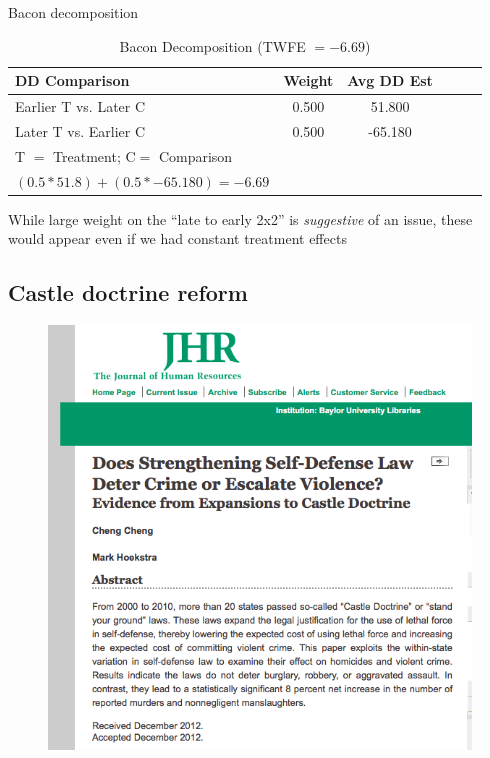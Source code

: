 \documentclass{beamer}
\begin{document}
\begin{frame}{Bacon decomposition}
\begin{table}[htbp]\centering
\small
\caption{Bacon Decomposition (TWFE $= -6.69$)}
\begin{center}
\begin{tabular}{l*{5}{c}}
\hline
\multicolumn{1}{l}{\textbf{DD Comparison}}&
\multicolumn{1}{l}{\textbf{Weight}}&
\multicolumn{1}{l}{\textbf{Avg DD Est}}\\
\hline
Earlier T vs. Later C  &     0.500   &       51.800 \\
Later T vs. Earlier C   &    0.500    &     -65.180 \\
\midrule
T $=$ Treatment; C$ =$ Comparison \\
$(0.5*51.8) + (0.5*-65.180) = -6.69$ \\
\hline
\end{tabular}
\end{center}
\end{table}

\bigskip

While large weight on the ``late to early 2x2'' is \emph{suggestive} of an issue, these would appear even if we had constant treatment effects

\end{frame}



\subsection{Castle doctrine reform}


\begin{frame}[plain]
	\begin{figure}
	\includegraphics[scale=0.5]{./lecture_includes/cheng_and_hoekstra_jhr.png}
	\end{figure}

\end{frame}
\end{document}
